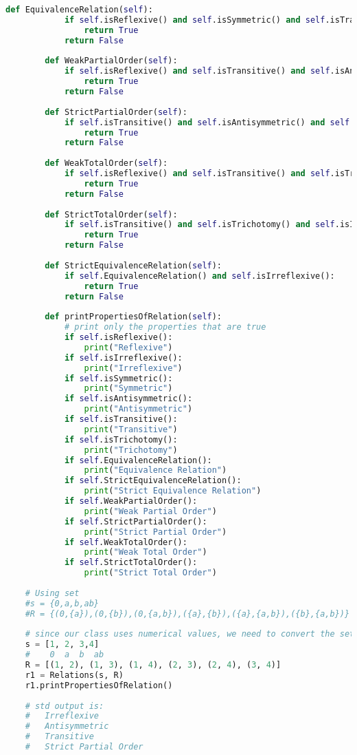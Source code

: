 \begin{lstlisting}[language=Python]
        def EquivalenceRelation(self):
            if self.isReflexive() and self.isSymmetric() and self.isTransitive():
                return True
            return False
    
        def WeakPartialOrder(self):
            if self.isReflexive() and self.isTransitive() and self.isAntisymmetric():
                return True
            return False
    
        def StrictPartialOrder(self):
            if self.isTransitive() and self.isAntisymmetric() and self.isIrreflexive():
                return True
            return False
    
        def WeakTotalOrder(self):
            if self.isReflexive() and self.isTransitive() and self.isTrichotomy():
                return True
            return False
    
        def StrictTotalOrder(self):
            if self.isTransitive() and self.isTrichotomy() and self.isIrreflexive():
                return True
            return False
    
        def StrictEquivalenceRelation(self):
            if self.EquivalenceRelation() and self.isIrreflexive():
                return True
            return False
    
        def printPropertiesOfRelation(self):
            # print only the properties that are true
            if self.isReflexive():
                print("Reflexive")
            if self.isIrreflexive():
                print("Irreflexive")
            if self.isSymmetric():
                print("Symmetric")
            if self.isAntisymmetric():
                print("Antisymmetric")
            if self.isTransitive():
                print("Transitive")
            if self.isTrichotomy():
                print("Trichotomy")
            if self.EquivalenceRelation():
                print("Equivalence Relation")
            if self.StrictEquivalenceRelation():
                print("Strict Equivalence Relation")
            if self.WeakPartialOrder():
                print("Weak Partial Order")
            if self.StrictPartialOrder():
                print("Strict Partial Order")
            if self.WeakTotalOrder():
                print("Weak Total Order")
            if self.StrictTotalOrder():
                print("Strict Total Order")
    
    # Using set
    #s = {0,a,b,ab}
    #R = {(0,{a}),(0,{b}),(0,{a,b}),({a},{b}),({a},{a,b}),({b},{a,b})}
    
    # since our class uses numerical values, we need to convert the set to a list of numbers and tuples of ordered pairs
    s = [1, 2, 3,4]
    #    0  a  b  ab
    R = [(1, 2), (1, 3), (1, 4), (2, 3), (2, 4), (3, 4)]
    r1 = Relations(s, R)
    r1.printPropertiesOfRelation()
    
    # std output is:
    #   Irreflexive
    #   Antisymmetric
    #   Transitive
    #   Strict Partial Order
    
\end{lstlisting}

